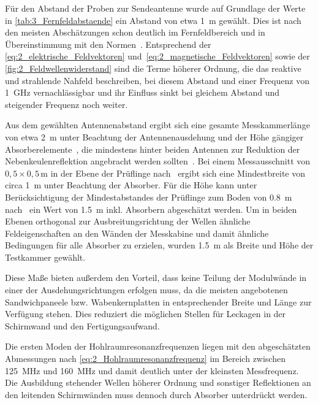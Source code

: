 Für den Abstand der Proben zur Sendeantenne wurde auf Grundlage der Werte in \Tabelle\ref{tab:3_Fernfeldabstaende} ein Abstand von etwa \SI{1}{\meter} gewählt. Dies ist nach den meisten Abschätzungen schon deutlich im Fernfeldbereich und in Übereinstimmung mit den Normen~\cite{DIN_EN_61000-4-3, VG_95373_15}. Entsprechend der \Gleichungen\eqref{eq:2_elektrische_Feldvektoren} und~\eqref{eq:2_magnetische_Feldvektoren} sowie der \Abb\ref{fig:2_Feldwellenwiderstand} sind die Terme höherer Ordnung, die das reaktive und strahlende Nahfeld beschreiben, bei diesem Abstand und einer Frequenz von \SI{1}{\giga\hertz} vernachlässigbar und ihr Einfluss sinkt bei gleichem Abstand und steigender Frequenz noch weiter. 
\par
\vspace{\linespace}
Aus dem gewählten Antennenabstand ergibt sich eine gesamte Messkammerlänge von etwa \SI{2}{\meter} unter Beachtung der Antennenausdehung und der Höhe gängiger Absorberelemente~\cite{Telemeter_Produktseite, EMV-Support_Produktseite}, die mindestens hinter beiden Antennen zur Reduktion der Nebenkeulenreflektion angebracht werden sollten~\cite{Optimierung_Feldhomogenitaet, EM_Schirmung}. Bei einem Messausschnitt von $0,5 \times 0,5\,\si{\meter}$ in der Ebene der Prüflinge nach~\cite{DIN_EN_61000-4-3} ergibt sich eine Mindestbreite von circa \SI{1}{\meter} unter Beachtung der Absorber. Für die Höhe kann unter Berücksichtigung der Mindestabstandes der Prüflinge zum Boden von \SI{0,8}{\meter} nach~\cite{DIN_EN_61000-4-3, DIN_EN_61000-5-7} ein Wert von \SI{1,5}{\meter} inkl. Absorbern abgeschätzt werden. Um in beiden Ebenen orthogonal zur Ausbreitungsrichtung der Wellen ähnliche Feldeigenschaften an den Wänden der Messkabine und damit ähnliche Bedingungen für alle Absorber zu erzielen, wurden \SI{1,5}{\meter} als Breite und Höhe der Testkammer gewählt. 
\par
\vspace{\linespace}
Diese Maße bieten außerdem den Vorteil, dass keine Teilung der Modulwände in einer der Ausdehungsrichtungen erfolgen muss, da die meisten angebotenen Sandwichpaneele bzw. Wabenkernplatten in entsprechender Breite und Länge zur Verfügung stehen. Dies reduziert die möglichen Stellen für Leckagen in der Schirmwand und den Fertigungsaufwand.
\par
\vspace{\linespace}
Die ersten Moden der Hohlraumresonanzfrequenzen liegen mit den abgeschätzten Abmessungen nach \Gleichung\eqref{eq:2_Hohlraumresonanzfrequenz} im Bereich zwischen \SI{125}{\mega\hertz} und \SI{160}{\mega\hertz} und damit deutlich unter der kleinsten Messfrequenz. Die Ausbildung stehender Wellen höherer Ordnung und sonstiger Reflektionen an den leitenden Schirmwänden muss dennoch durch Absorber unterdrückt werden.
